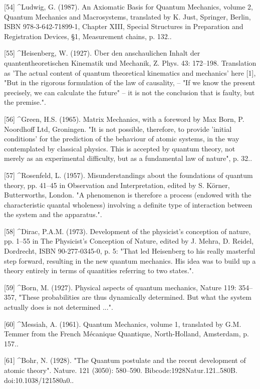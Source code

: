 [54]
^Ludwig, G. (1987). An Axiomatic Basis for Quantum Mechanics, volume 2, Quantum Mechanics and Macrosystems, translated by K. Just, Springer, Berlin, ISBN 978-3-642-71899-1, Chapter XIII, Special Structures in Preparation and Registration Devices, §1, Measurement chains, p. 132..

[55]
^Heisenberg, W. (1927). Über den anschaulichen Inhalt der quantentheoretischen Kinematik und Mechanik, Z. Phys. 43: 172–198. Translation as 'The actual content of quantum theoretical kinematics and mechanics' here [1], "But in the rigorous formulation of the law of causality, – "If we know the present precisely, we can calculate the future" – it is not the conclusion that is faulty, but the premise.".

[56]
^Green, H.S. (1965). Matrix Mechanics, with a foreword by Max Born, P. Noordhoff Ltd, Groningen. "It is not possible, therefore, to provide 'initial conditions' for the prediction of the behaviour of atomic systems, in the way contemplated by classical physics. This is accepted by quantum theory, not merely as an experimental difficulty, but as a fundamental law of nature", p. 32..

[57]
^Rosenfeld, L. (1957). Misunderstandings about the foundations of quantum theory, pp. 41–45 in Observation and Interpretation, edited by S. Körner, Butterworths, London. "A phenomenon is therefore a process (endowed with the characteristic quantal wholeness) involving a definite type of interaction between the system and the apparatus.".

[58]
^Dirac, P.A.M. (1973). Development of the physicist's conception of nature, pp. 1–55 in The Physicist's Conception of Nature, edited by J. Mehra, D. Reidel, Dordrecht, ISBN 90-277-0345-0, p. 5: "That led Heisenberg to his really masterful step forward, resulting in the new quantum mechanics. His idea was to build up a theory entirely in terms of quantities referring to two states.".

[59]
^Born, M. (1927). Physical aspects of quantum mechanics, Nature 119: 354–357, "These probabilities are thus dynamically determined. But what the system actually does is not determined ...".

[60]
^Messiah, A. (1961). Quantum Mechanics, volume 1, translated by G.M. Temmer from the French Mécanique Quantique, North-Holland, Amsterdam, p. 157..

[61]
^Bohr, N. (1928). "The Quantum postulate and the recent development of atomic theory". Nature. 121 (3050): 580–590. Bibcode:1928Natur.121..580B. doi:10.1038/121580a0..

